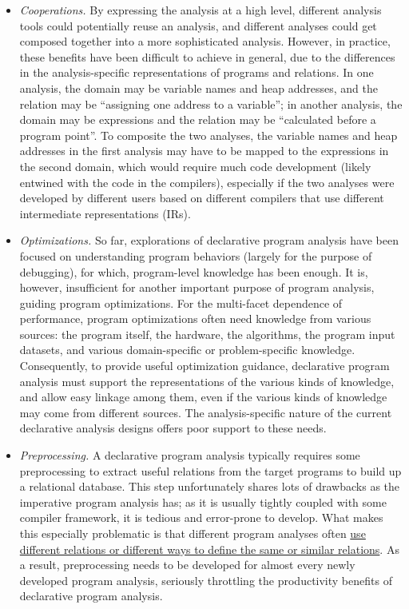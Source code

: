 \begin{itemize}
\item {\em Cooperations.} 
By expressing the analysis at a high level, different analysis tools
could potentially reuse an analysis, and different analyses could get
composed together into a more sophisticated analysis. However, in
practice, these benefits have been difficult to achieve in general,
due to the differences in the analysis-specific representations of
programs and relations. In one analysis, the domain may be variable
names and heap addresses, and the relation may be ``assigning one
address to a variable''; in another analysis, the domain may be
expressions and the relation may be ``calculated before a program
point''. To composite the two analyses, the variable names and heap
addresses in the first analysis may have to be mapped to the
expressions in the second domain, which would require much code
development (likely entwined with the code in the compilers),
especially if the two analyses were developed by different users based
on different compilers that use different intermediate representations
(IRs).

\item {\em Optimizations.} 
So far, explorations of declarative program analysis have been focused
on understanding program behaviors (largely for the purpose of
debugging), for which, program-level knowledge has been enough. It
is, however, insufficient for another important purpose of program
analysis, guiding program optimizations. For the multi-facet dependence
of performance, program optimizations often need knowledge from various
sources: the program itself, the hardware, the algorithms, the program
input datasets, and various domain-specific or problem-specific
knowledge. Consequently, to provide useful optimization guidance,
declarative program analysis must support the representations of the
various kinds of knowledge, and allow easy linkage among them, even if
the various kinds of knowledge may come from different sources. The
analysis-specific nature of the current declarative analysis designs
offers poor support to these needs.

\item {\em Preprocessing.} A declarative program analysis typically
requires some preprocessing to extract useful relations from the
target programs to build up a relational database. This step
unfortunately shares lots of drawbacks as the imperative program
analysis has; as it is usually tightly coupled with some compiler
framework, it is tedious and error-prone to develop. What makes this
especially problematic is that different program analyses
often \underline{use different relations or different ways to define
the same or similar relations}. As a result, preprocessing needs to be
developed for almost every newly developed program analysis,
seriously throttling the productivity benefits of declarative program
analysis.
\end{itemize}

